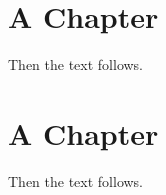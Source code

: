 \documentclass{book}
\begin{document}
\chapter{A Chapter}

Then the text follows.
\chapter{A Chapter}
Then the text follows.
\end{document}
